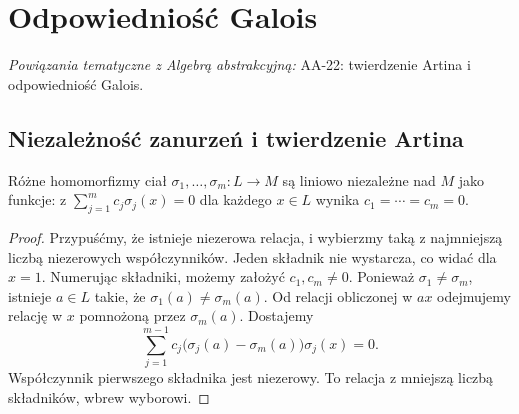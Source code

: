\chapter{Odpowiedniość Galois}

\providecommand{\atlasref}[2]{#2}
\noindent\emph{Powiązania tematyczne z Algebrą abstrakcyjną:} \atlasref{AA-22::aa:ch:galois-correspondence}{AA-22: twierdzenie Artina i odpowiedniość Galois}.


\section{Niezależność zanurzeń i twierdzenie Artina}

\begin{lemat}
Różne homomorfizmy ciał $\sigma_1,\dots,\sigma_m:L\to M$ są liniowo niezależne nad $M$ jako funkcje: z $\sum_{j=1}^m c_j\sigma_j(x)=0$ dla każdego $x\in L$ wynika $c_1=\cdots=c_m=0$.
\end{lemat}
\begin{proof}
Przypuśćmy, że istnieje niezerowa relacja, i wybierzmy taką z najmniejszą liczbą niezerowych współczynników. Jeden składnik nie wystarcza, co widać dla $x=1$. Numerując składniki, możemy założyć $c_1,c_m\ne0$. Ponieważ $\sigma_1\ne\sigma_m$, istnieje $a\in L$ takie, że $\sigma_1(a)\ne\sigma_m(a)$. Od relacji obliczonej w $ax$ odejmujemy relację w $x$ pomnożoną przez $\sigma_m(a)$. Dostajemy
\[
\sum_{j=1}^{m-1}c_j\bigl(\sigma_j(a)-\sigma_m(a)\bigr)\sigma_j(x)=0.
\]
Współczynnik pierwszego składnika jest niezerowy. To relacja z mniejszą liczbą składników, wbrew wyborowi.
\end{proof}

